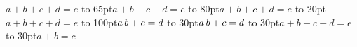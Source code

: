 \documentclass[10pt]{article}
\begin{document}
\hbox{$\displaystyle a+b+c+d=e$}
\hbox to 65pt{$\displaystyle a+b+c+d=e$}
\hbox to 80pt{$\displaystyle a+b+c+d=e$}
\hbox to 20pt{$\displaystyle a+b+c+d=e$}
\hbox to 100pt{$\displaystyle a\mskip 3mu plus 1fill b+c=d$}
\hbox to 30pt{$\displaystyle a\hskip 2pt plus 3pt minus 1pt b+c=d$}
\hbox to 30pt{$a+b+c+d=e$}
\hbox to 30pt{$\scriptstyle a+b=c$}
\end{document}
